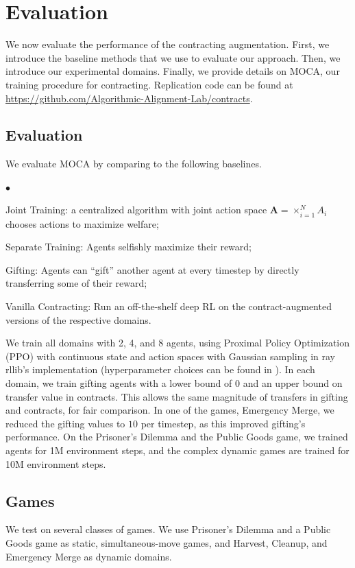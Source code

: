 \documentclass[referee,sn-basic]{sn-jnl}
\newenvironment{tightlist}
{\begin{list}{$\bullet$}{
    \setlength{\topsep}{0in}
    \setlength{\partopsep}{0in}
    \setlength{\itemsep}{0in}
    \setlength{\parsep}{0in}
    \setlength{\leftmargin}{1.5em}
    \setlength{\rightmargin}{0in}
    \setlength{\itemindent}{0in}
}
}%
{\end{list}
}
\theoremstyle{thmstyleone}%
\theoremstyle{thmstyletwo}%
\theoremstyle{thmstylethree}%
\begin{document}
\section{Evaluation}\label{sec:methodology}
We now evaluate the performance of the contracting augmentation. First, we introduce the baseline methods that we use to evaluate our approach. Then, we introduce our experimental domains. Finally, we provide details on MOCA, our training procedure for contracting. Replication code can be found at \url{https://github.com/Algorithmic-Alignment-Lab/contracts}.

\subsection{Evaluation}
We evaluate MOCA by comparing to the following baselines.
\begin{tightlist}
\item Joint Training: a centralized algorithm with joint action space $\mathbf A = \times_{i=1}^N A_i$ chooses actions to maximize welfare;
\item Separate Training: Agents selfishly maximize their reward;
\item Gifting: Agents can \enquote{gift} \cite{lupu2020gifting} another agent at every timestep by directly transferring some of their reward;
\item Vanilla Contracting: Run an off-the-shelf deep RL on the contract-augmented versions of the respective domains.
\end{tightlist}
We train all domains with 2, 4, and 8 agents, using Proximal Policy Optimization (PPO) \cite{schulman2017proximal} with continuous state and action spaces with Gaussian sampling in ray rllib's \cite{liang2018rllib} implementation (hyperparameter choices can be found in ). In each domain, we train gifting agents with a lower bound of $0$ and an upper bound on transfer value in contracts. This allows the same magnitude of transfers in gifting and contracts, for fair comparison. In one of the games, Emergency Merge, we reduced the gifting values to $10$ per timestep, as this improved gifting's performance. On the Prisoner's Dilemma and the Public Goods game, we trained agents for 1M environment steps, and the complex dynamic games are trained for 10M environment steps.

\subsection{Games}
We test on several classes of games. We use Prisoner's Dilemma and a Public Goods game as static, simultaneous-move games, and Harvest, Cleanup, and Emergency Merge as dynamic domains.
\end{document}
